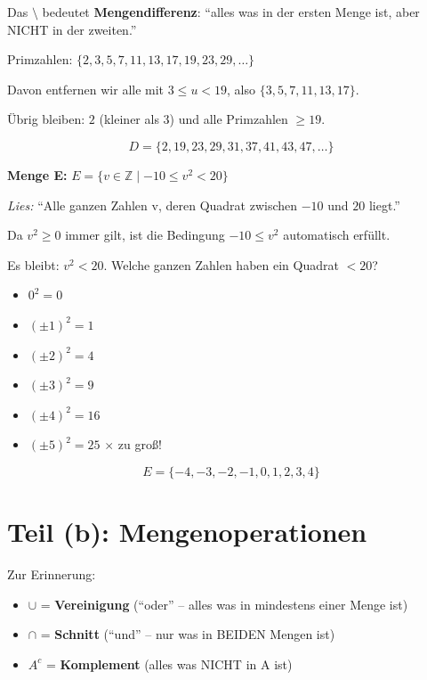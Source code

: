 \documentclass[12pt, a4paper]{article}
\begin{document}
Das $\setminus$ bedeutet \textbf{Mengendifferenz}: "`alles was in der ersten Menge ist, aber NICHT in der zweiten."'

Primzahlen: $\{2, 3, 5, 7, 11, 13, 17, 19, 23, 29, \ldots\}$

Davon entfernen wir alle mit $3 \leq u < 19$, also $\{3, 5, 7, 11, 13, 17\}$.

Übrig bleiben: $2$ (kleiner als 3) und alle Primzahlen $\geq 19$.

\[
    \boxed{D = \{2, 19, 23, 29, 31, 37, 41, 43, 47, \ldots\}}
\]

\bigskip

\textbf{Menge E:} $E = \{v \in \mathbb{Z} \mid -10 \leq v^2 < 20\}$

\textit{Lies:} "`Alle ganzen Zahlen v, deren Quadrat zwischen $-10$ und $20$ liegt."'

Da $v^2 \geq 0$ immer gilt, ist die Bedingung $-10 \leq v^2$ automatisch erfüllt.

Es bleibt: $v^2 < 20$. Welche ganzen Zahlen haben ein Quadrat $< 20$?
\begin{itemize}
    \item $0^2 = 0$ \checkmark
    \item $(\pm 1)^2 = 1$ \checkmark
    \item $(\pm 2)^2 = 4$ \checkmark
    \item $(\pm 3)^2 = 9$ \checkmark
    \item $(\pm 4)^2 = 16$ \checkmark
    \item $(\pm 5)^2 = 25$ $\times$ zu groß!
\end{itemize}

\[
    \boxed{E = \{-4, -3, -2, -1, 0, 1, 2, 3, 4\}}
\]

\section*{Teil (b): Mengenoperationen}

Zur Erinnerung:
\begin{itemize}
    \item $\cup$ = \textbf{Vereinigung} ("`oder"' -- alles was in mindestens einer Menge ist)
    \item $\cap$ = \textbf{Schnitt} ("`und"' -- nur was in BEIDEN Mengen ist)
    \item $A^c$ = \textbf{Komplement} (alles was NICHT in A ist)
\end{itemize}
\end{document}
